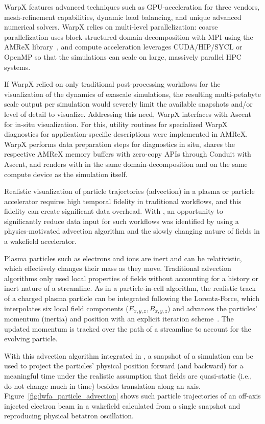 WarpX features advanced techniques such as GPU-acceleration for three vendors, mesh-refinement capabilities, dynamic load balancing, and unique advanced numerical solvers.
WarpX relies on multi-level parallelization: coarse parallelization uses block-structured domain decomposition with MPI using the AMReX library~\citep{Zhang2019}, and compute acceleration leverages CUDA/HIP/SYCL or OpenMP so that the simulations can scale on large, massively parallel HPC systems.

If WarpX relied on only traditional post-processing workflows for the visualization of the dynamics of exascale simulations, the resulting multi-petabyte scale output per simulation would severely limit the available snapshots and/or level of detail to visualize.
Addressing this need, WarpX interfaces with Ascent for in-situ visualization.
For this, utility routines for specialized WarpX diagnostics for application-specific descriptions were implemented in AMReX.
WarpX performs data preparation steps for diagnostics in situ, shares the respective AMReX memory buffers with zero-copy APIs through Conduit with Ascent, and renders with \vtkm in the same domain-decomposition and on the same compute device as the simulation itself.

Realistic visualization of particle trajectories (advection) in a plasma or particle accelerator requires high temporal fidelity in traditional workflows, and this fidelity can create significant data overhead.
With \vtkm, an opportunity to significantly reduce data input for such workflows was identified by using a physics-motivated advection algorithm and the slowly changing nature of fields in a wakefield accelerator.

Plasma particles such as electrons and ions are inert and can be relativistic, which effectively changes their mass as they move.
Traditional advection algorithms only used local properties of fields without accounting for a history or inert nature of a streamline.
As in a particle-in-cell algorithm, the realistic track of a charged plasma particle can be integrated following the Lorentz-Force, which interpolates six local field components ($E_{x,y,z}, B_{x,y,z}$) and advances the particles' momentum (inertia) and position with an explicit iteration scheme~\citep{Boris1970}.
The updated momentum is tracked over the path of a streamline to account for the evolving particle.

With this advection algorithm integrated in \vtkm, a snapshot of a simulation can be used to project the particles' physical position forward (and backward) for a meaningful time under the realistic assumption that fields are quasi-static (i.e., do not change much in time) besides translation along an axis.
Figure~\ref{fig:lwfa_particle_advection} shows such particle trajectories of an off-axis injected electron beam in a wakefield calculated from a single snapshot and reproducing physical betatron oscillation.


